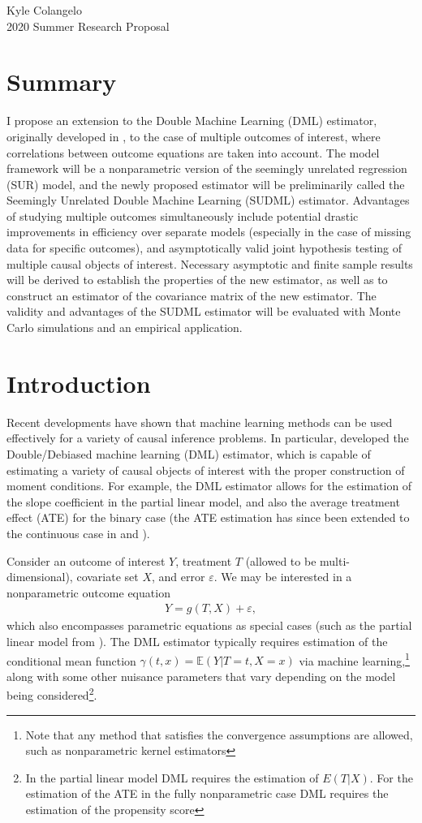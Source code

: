 \documentclass[12pt]{article}
\begin{document}
	\begin{center}
	Kyle Colangelo\\
	2020 Summer Research Proposal
	\end{center}
\section{Summary}
I propose an extension to the Double Machine Learning (DML) estimator, originally developed in  \cite{chernozhukov2018double}, to the case of multiple outcomes of interest, where correlations between outcome equations are taken into account. The model framework will be a nonparametric version of the seemingly unrelated regression (SUR) model, and the newly proposed estimator will be preliminarily called the Seemingly Unrelated Double Machine Learning (SUDML) estimator. Advantages of studying multiple outcomes simultaneously include potential drastic improvements in efficiency over separate models (especially in the case of missing data for specific outcomes), and asymptotically valid joint hypothesis testing of multiple causal objects of interest. Necessary asymptotic and finite sample results will be derived to establish the properties of the new estimator, as well as to construct an estimator of the covariance matrix of the new estimator. The validity and advantages of the SUDML estimator will be evaluated with Monte Carlo simulations and an empirical application.
\section{Introduction}
Recent developments have shown that machine learning methods can be used effectively for a variety of causal inference problems. In particular, \cite{chernozhukov2018double} developed the Double/Debiased machine learning (DML) estimator, which is capable of estimating a variety of causal objects of interest with the proper construction of moment conditions. For example, the DML estimator allows for the estimation of the slope coefficient in the partial linear model, and also the average treatment effect (ATE) for the binary case (the ATE estimation has since been extended to the continuous case in \cite{su2019non} and \cite{colangelo2020double}).

Consider an outcome of interest $Y$, treatment $T$ (allowed to be multi-dimensional), covariate set $X$, and error $\varepsilon$. We may be interested in a nonparametric outcome equation
\begin{align}
	Y = g(T,X) + \varepsilon\label{eq:1},
\end{align}
which also encompasses parametric equations as special cases (such as the partial linear model from \cite{robinson1988root}). The DML estimator typically requires estimation  of the conditional mean function $\gamma(t,x) = \mathbb{E}(Y|T=t,X=x)$ via machine learning,\footnote{Note that any method that satisfies the convergence assumptions are allowed, such as nonparametric kernel estimators} along with some other nuisance parameters that vary depending on the model being considered\footnote{In the partial linear model DML requires the estimation of $E(T|X)$. For the estimation of the ATE in the fully nonparametric case DML requires the estimation of the propensity score}.
\end{document}
